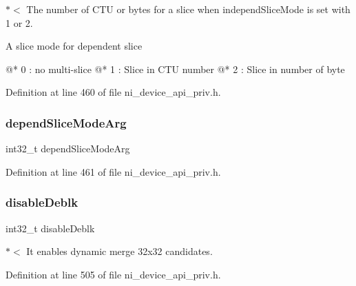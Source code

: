 $\ast$$<$ The number of C\+TU or bytes for a slice when independ\+Slice\+Mode is set with 1 or 2.


\begin{DoxyItemize}
\item \begin{DoxyVerb}A slice mode for dependent slice

@* 0 : no multi-slice
@* 1 : Slice in CTU number
@* 2 : Slice in number of byte
\end{DoxyVerb}
 
\end{DoxyItemize}

Definition at line 460 of file ni\+\_\+device\+\_\+api\+\_\+priv.\+h.

\mbox{\label{struct__ni__encoder__change__params__t_a418194649eee2e58f35a84e155b9d02f}} 
\subsubsection{\texorpdfstring{dependSliceModeArg}{dependSliceModeArg}}
{\footnotesize\ttfamily int32\+\_\+t depend\+Slice\+Mode\+Arg}



Definition at line 461 of file ni\+\_\+device\+\_\+api\+\_\+priv.\+h.

\mbox{\label{struct__ni__encoder__change__params__t_a7c82aec867ab070248f2e6135071b680}} 
\subsubsection{\texorpdfstring{disableDeblk}{disableDeblk}}
{\footnotesize\ttfamily int32\+\_\+t disable\+Deblk}

$\ast$$<$ It enables dynamic merge 32x32 candidates. 

Definition at line 505 of file ni\+\_\+device\+\_\+api\+\_\+priv.\+h.

\mbox{\label{struct__ni__encoder__change__params__t_a1d42364a75135b48b08cf33e41f153d7}} 
